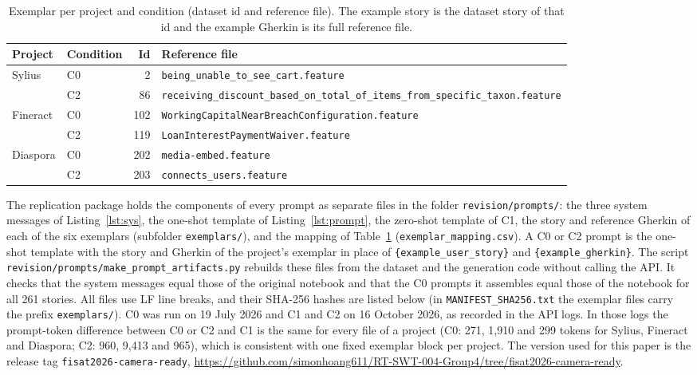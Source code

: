 \begin{table}[H]
\centering
\caption{Exemplar per project and condition (dataset id and reference file). The example story is the dataset story of that id and the example Gherkin is its full reference file.}
\label{tab:prompts}
\begin{tabular}{@{}llr>{\raggedright\arraybackslash}p{7.6cm}@{}}
\hline
Project & Condition & Id & Reference file\\
\hline
Sylius & C0 & 2 & \nolinkurl{being_unable_to_see_cart.feature}\\
 & C2 & 86 & \nolinkurl{receiving_discount_based_on_total_of_items_from_specific_taxon.feature}\\
Fineract & C0 & 102 & \nolinkurl{WorkingCapitalNearBreachConfiguration.feature}\\
 & C2 & 119 & \nolinkurl{LoanInterestPaymentWaiver.feature}\\
Diaspora & C0 & 202 & \nolinkurl{media-embed.feature}\\
 & C2 & 203 & \nolinkurl{connects_users.feature}\\
\hline
\end{tabular}
\end{table}

The replication package holds the components of every prompt as separate files in the folder \texttt{revision/prompts/}: the three system messages of Listing~\ref{lst:sys}, the one-shot template of Listing~\ref{lst:prompt}, the zero-shot template of C1, the story and reference Gherkin of each of the six exemplars (subfolder \texttt{exemplars/}), and the mapping of Table~\ref{tab:prompts} (\texttt{exemplar\_mapping.csv}). A C0 or C2 prompt is the one-shot template with the story and Gherkin of the project's exemplar in place of \texttt{\{example\_user\_story\}} and \texttt{\{example\_gherkin\}}. The script \texttt{revision/prompts/make\_prompt\_artifacts.py} rebuilds these files from the dataset and the generation code without calling the API. It checks that the system messages equal those of the original notebook and that the C0 prompts it assembles equal those of the notebook for all 261 stories. All files use LF line breaks, and their SHA-256 hashes are listed below (in \texttt{MANIFEST\_SHA256.txt} the exemplar files carry the prefix \texttt{exemplars/}). C0 was run on 19 July 2026 and C1 and C2 on 16 October 2026, as recorded in the API logs. In those logs the prompt-token difference between C0 or C2 and C1 is the same for every file of a project (C0: 271, 1,910 and 299 tokens for Sylius, Fineract and Diaspora; C2: 960, 9,413 and 965), which is consistent with one fixed exemplar block per project. The version used for this paper is the release tag \texttt{fisat2026-camera-ready}, \url{https://github.com/simonhoang611/RT-SWT-004-Group4/tree/fisat2026-camera-ready}.

